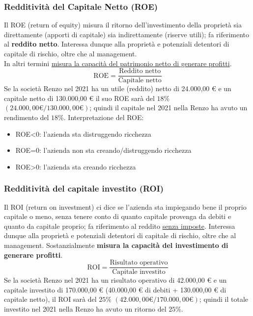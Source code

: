 \documentclass{article}
\begin{document}
\subsubsection{Redditività del Capitale Netto (ROE)}
Il ROE (return of equity) misura il ritorno dell’investimento della proprietà sia direttamente (apporti di capitale) sia indirettamente (riserve utili); fa riferimento al \textbf{reddito netto}. Interessa dunque alla proprietà e potenziali detentori di capitale di rischio, oltre che al management.\\
In altri termini \underline{misura la capacità del patrimonio netto di generare profitti}. 
\[
    \text{ROE} = \frac{\text{Reddito netto}}{\text{Capitale netto}}
\]
Se la società Renzo nel 2021 ha un utile (reddito) netto di
24.000,00 € e un capitale netto di 130.000,00 € il suo ROE sarà del $18\%$ $\left( 24.000,00 \text{€} / 130.000,00 \text{€} \right)$; quindi il capitale  nel 2021 nella Renzo ha avuto un rendimento del $18\%$.
Interpretazione del ROE:
\begin{itemize}
    \item ROE<0: l’azienda sta distruggendo ricchezza
    \item ROE=0: l’azienda non sta creando/distruggendo ricchezza
    \item ROE>0: l’azienda sta creando ricchezza
\end{itemize}



\subsubsection{Redditività del capitale investito (ROI)}
Il ROI (return on investment) ci dice se l'azienda sta impiegando bene il proprio capitale o meno, senza tenere conto di quanto capitale provenga da debiti e quanto da capitale proprio; fa riferimento al reddito \underline{senza imposte}. Interessa dunque alla proprietà e potenziali detentori di capitale di rischio, oltre che al management. Sostanzialmente \textbf{misura la capacità del investimento di generare profitti}.
\[
    \text{ROI} = \frac{\text{Risultato operativo}}{\text{Capitale investito}}
\]
Se la società Renzo nel 2021 ha un risultato operativo di 42.000,00
€ e un capitale investito di 170.000,00 € (40.000,00 € di debiti +
130.000,00 € di capitale netto), il ROI sarà del $25\%$ $\left( 42.000,00 \text{€} / 170.000,00 \text{€} \right)$; quindi il totale investito nel 2021 nella Renzo ha avuto un ritorno del $25\%$.
\end{document}
